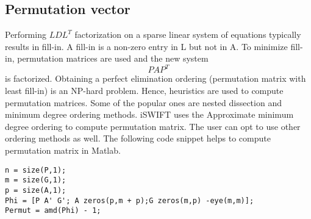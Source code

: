 \documentclass[10pt]{article}
\begin{document}
	\subsection{Permutation vector}
		Performing $LDL^T$ factorization on a sparse linear system of equations typically results in fill-in. A fill-in is a non-zero entry in L but not in A. To minimize fill-in, permutation matrices are used and the new system
			\begin{equation}
					PAP^T
			\end{equation}
			is factorized. Obtaining a perfect elimination ordering (permutation matrix with least fill-in) is an NP-hard problem. Hence, heuristics are used to compute permutation matrices. Some of the popular ones are nested dissection and minimum degree ordering methods. iSWIFT uses the Approximate minimum degree ordering to compute permutation matrix. The user can opt to use other ordering methods as well. The following code snippet helps to compute permutation matrix in Matlab. 
\begin{lstlisting}
n = size(P,1);
m = size(G,1);
p = size(A,1);
Phi = [P A' G'; A zeros(p,m + p);G zeros(m,p) -eye(m,m)];
Permut = amd(Phi) - 1;
\end{lstlisting}			
%
%
\end{document}
